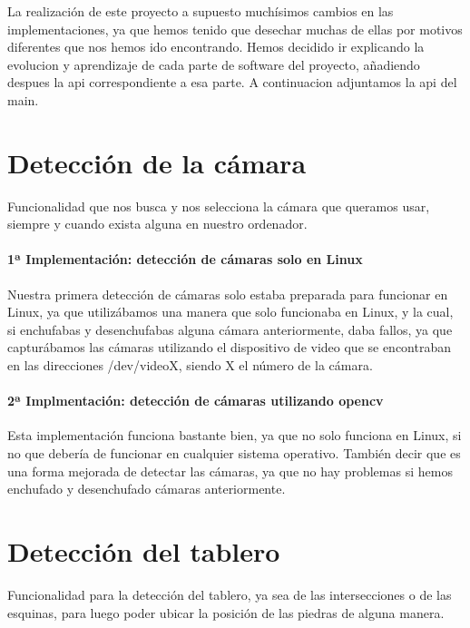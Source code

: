 \documentclass[12pt,a4paper]{report}
\begin{document}
La realización de este proyecto a supuesto muchísimos cambios en las
implementaciones, ya que hemos tenido que desechar muchas de ellas por motivos
diferentes que nos hemos ido encontrando. Hemos decidido ir explicando la evolucion y aprendizaje de cada parte de software del proyecto, añadiendo despues la api correspondiente a esa parte. A continuacion adjuntamos la api del main.



\section{Detección de la cámara} 
Funcionalidad que nos busca y nos selecciona la cámara que queramos usar,
siempre y cuando exista alguna en nuestro ordenador. 

\paragraph{1ª Implementación: detección de cámaras solo en Linux}

Nuestra primera detección de cámaras solo estaba preparada para funcionar en
Linux, ya que utilizábamos una manera que solo funcionaba en Linux, y la cual,
si enchufabas y desenchufabas alguna cámara anteriormente, daba fallos, ya que
capturábamos las cámaras utilizando el dispositivo de video que se encontraban
en las direcciones /dev/videoX, siendo X el número de la cámara. 

\paragraph{2ª Implmentación: detección de cámaras utilizando opencv}

Esta implementación funciona bastante bien, ya que no solo funciona en Linux, 
si no que debería de funcionar en cualquier sistema operativo. También decir que
es una forma mejorada de detectar las cámaras, ya que no hay problemas si hemos
enchufado y desenchufado cámaras anteriormente. 




\section{Detección del tablero} 
Funcionalidad para la detección del tablero, ya sea de las intersecciones o de
las esquinas, para luego poder ubicar la posición de las piedras de alguna
manera. 
\end{document}
